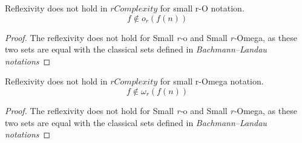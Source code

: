  
\begin{theorem} Reflexivity does not hold in $rComplexity$ for small r-O notation. 
\[ f \notin o_{r}(f(n)) \]
\end{theorem} 

\begin{proof} 
The reflexivity does not hold for Small \textit{r-}o and Small \textit{r-}Omega, as these two sets are equal with the classical sets defined in \textit{Bachmann–Landau notations}
\end{proof} 

\begin{theorem} Reflexivity does not hold in $rComplexity$ for small r-Omega notation.
\[ f \notin \omega_{r}(f(n)) \]
\end{theorem} 

\begin{proof} 
The reflexivity does not hold for Small \textit{r-}o and Small \textit{r-}Omega, as these two sets are equal with the classical sets defined in \textit{Bachmann–Landau notations}
\end{proof} 


